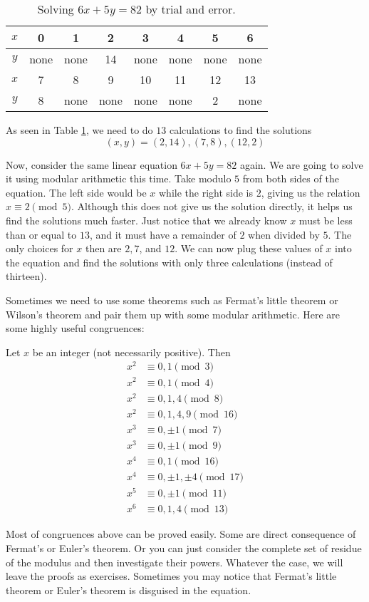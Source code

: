 \documentclass{subfile}
\begin{document}
\begin{table}[h]
\centering
\begin{tabular}{|c|c|c|c|c|c|c|c|}
\hline
$x$ & 0 & 1 & 2 & 3 & 4 & 5 & 6 \\
\hline
$y$ & none & none & 14 & none & none & none & none \\
\hline
$x$ & 7 & 8 & 9 & 10 & 11 & 12 & 13 \\
\hline
$y$ & 8 & none & none & none & none & 2 & none \\
\hline
\end{tabular}
\caption{Solving $6x+5y=82$ by trial and error.}
\label{table:diophantine}
\end{table}

			As seen in Table \ref{table:diophantine}, we need to do $13$ calculations to find the solutions $$(x, y)=(2,14), (7,8), (12, 2)$$

			Now, consider the same linear equation $6x+5y = 82$ again. We are going to solve it using modular arithmetic this time. Take modulo $5$ from both sides of the equation. The left side would be $x$ while the right side is $2$, giving us the relation $x \equiv 2 \pmod 5$. Although this does not give us the solution directly, it helps us find the solutions much faster. Just notice that we already know $x$ must be less than or equal to $13$, and it must have a remainder of $2$ when divided by $5$. The only choices for $x$ then are $2, 7$, and $12$. We can now plug these values of $x$ into the equation and find the solutions with only three calculations (instead of thirteen).


			Sometimes we need to use some theorems such as Fermat's little theorem or Wilson's theorem and pair them up with some modular arithmetic. Here are some highly useful congruences:
				\begin{theorem}\label{thm:diophModulo}
					Let $x$ be an integer (not necessarily positive). Then
					\begin{align*}
					x^2 & \equiv 0,1 \pmod3\\
					x^2 & \equiv 0,1 \pmod4\\
					x^2 & \equiv 0,1,4\pmod8\\
					x^2 & \equiv 0,1,4,9 \pmod{16}\\
					x^3 & \equiv 0, \pm1 \pmod7\\
					x^3 & \equiv 0, \pm1 \pmod9\\
					x^4 & \equiv 0,1 \pmod{16}\\
					x^4 & \equiv 0, \pm 1, \pm 4 \pmod{17}\\
					x^5 & \equiv 0, \pm1 \pmod{11}\\
					x^6 & \equiv 0,1,4 \pmod{13}
					\end{align*}
				\end{theorem}
			Most of congruences above can be proved easily. Some are direct consequence of Fermat's or Euler's theorem. Or you can just consider the complete set of residue of the modulus and then investigate their powers. Whatever the case, we will leave the proofs as exercises. Sometimes you may notice that Fermat's little theorem or Euler's theorem is disguised in the equation.
\end{document}
